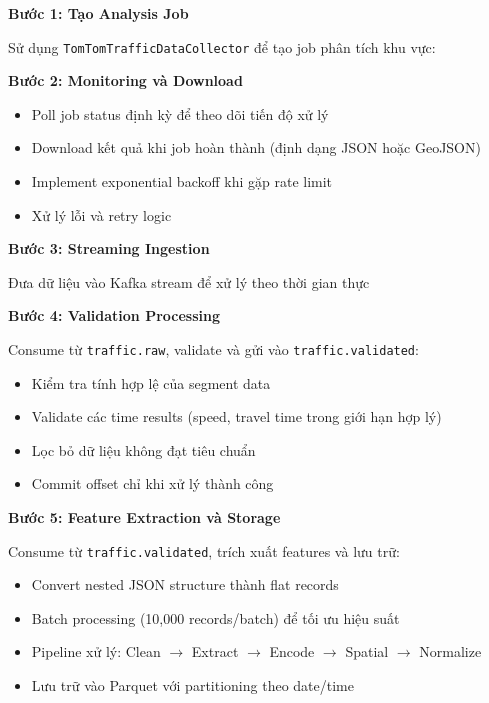 
\textbf{Bước 1: Tạo Analysis Job}

Sử dụng \texttt{TomTomTrafficDataCollector} để tạo job phân tích khu vực:

\textbf{Bước 2: Monitoring và Download}

\begin{itemize}
    \item Poll job status định kỳ để theo dõi tiến độ xử lý
    \item Download kết quả khi job hoàn thành (định dạng JSON hoặc GeoJSON)
    \item Implement exponential backoff khi gặp rate limit
    \item Xử lý lỗi và retry logic
\end{itemize}

\textbf{Bước 3: Streaming Ingestion}

Đưa dữ liệu vào Kafka stream để xử lý theo thời gian thực

\textbf{Bước 4: Validation Processing}

Consume từ \texttt{traffic.raw}, validate và gửi vào \texttt{traffic.validated}:

\begin{itemize}
    \item Kiểm tra tính hợp lệ của segment data
    \item Validate các time results (speed, travel time trong giới hạn hợp lý)
    \item Lọc bỏ dữ liệu không đạt tiêu chuẩn
    \item Commit offset chỉ khi xử lý thành công
\end{itemize}

\textbf{Bước 5: Feature Extraction và Storage}

Consume từ \texttt{traffic.validated}, trích xuất features và lưu trữ:

\begin{itemize}
    \item Convert nested JSON structure thành flat records
    \item Batch processing (10,000 records/batch) để tối ưu hiệu suất
    \item Pipeline xử lý: Clean $\rightarrow$ Extract $\rightarrow$ Encode $\rightarrow$ Spatial $\rightarrow$ Normalize
    \item Lưu trữ vào Parquet với partitioning theo date/time
\end{itemize}

